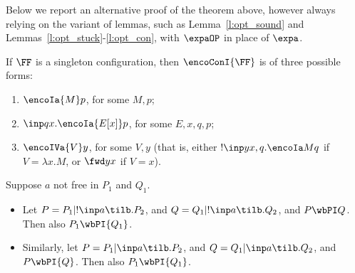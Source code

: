 






\noindent
Below we report an alternative proof of the theorem above, however
always relying  on the variant of lemmas, such as  
 Lemma~\ref{l:opt_sound} and Lemmas~\ref{l:opt_stuck}-\ref{l:opt_con}, with 
$\expaOP $ in place of $\expa$. 

\begin{lemma}
\label{l:shapesT}
If $\FF$ is a singleton configuration, then  $\encoConI{\FF}$ is of three possible forms: 
\begin{enumerate}
\item 
$\encoIa {M} p$, for some $M,p$;
\item
$\inp qx .\encoIa {E[x]} p $, for some $E,x,q,p$;
\item 
$\encoIVa {V} y$, for some $V,y$ (that is, either  $!\inp y {x,q}.\encoIa M q$ if $V  =
\lambda x. M$, or $ \fwd y x$ if $V = x$).
\end{enumerate}  
\end{lemma} 


\begin{lemma}
\label{l:deco}
Suppose  $a$ not free in $P_1 $ and $Q_1$. 
\begin{itemize}
\item
Let $P = P_1 | ! \inp a {\tilb}.P_2$, 
and $Q = Q_1 | ! \inp a {\tilb}.Q_2$, 
and  $ P \wbPI  Q$.
Then also 
  $ {P_1}  \wbPI  {Q_1}$.


\item 
Similarly, let $P = P_1 |  \inp a {\tilb}.P_2$, 
and $Q = Q_1 |  \inp a {\tilb}.Q_2$, 
and  $ {P} \wbPI  {Q}$.
Then also 
  $ {P_1}  \wbPI  {Q_1}$.
\end{itemize}
\end{lemma} 

